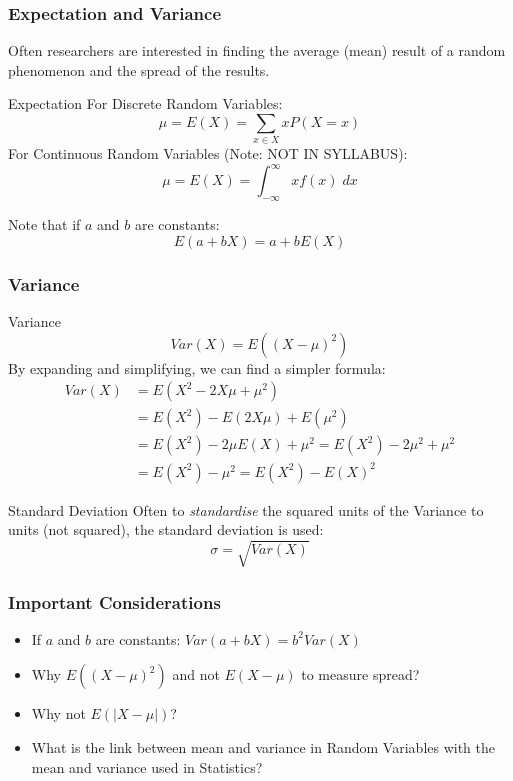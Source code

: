\documentclass{beamer}
\begin{document}
\begin{frame}
  \frametitle{Expectation and Variance}
  Often researchers are interested in finding the average (mean) result of a random phenomenon and the spread of the results.
  \begin{block}{Expectation}
    For Discrete Random Variables:
    \[ \mu = E(X) = \sum_{x \in X} xP(X=x) \]
    For Continuous Random Variables (Note: \alert{NOT IN SYLLABUS}):
    \[ \mu = E(X) = \int_{-\infty}^\infty xf(x)\;dx \]
  \end{block}
  Note that if $a$ and $b$ are constants: \[E(a+bX) = a + bE(X)\]
\end{frame}

\begin{frame}
  \frametitle{Variance}
  \begin{block}{Variance}
    \[ Var(X) = E((X-\mu)^2) \]
    By expanding and simplifying, we can find a simpler formula:
    \begin{align*}
      Var(X) & = E(X^2 - 2X\mu +\mu^2)\\
             & = E(X^2) - E(2X\mu) + E(\mu^2)\\
             & = E(X^2) - 2\mu E(X) + \mu^2 = E(X^2) - 2\mu^2 + \mu^2\\
             & = E(X^2) - \mu^2 = E(X^2) - E(X)^2
    \end{align*}
  \end{block}
  \begin{block}{Standard Deviation}
    Often to \emph{standardise} the squared units of the Variance to units (not squared), the standard deviation is used:
    \[\sigma = \sqrt{Var(X)}\]
  \end{block}
\end{frame}

\begin{frame}
  \frametitle{Important Considerations}
  \begin{itemize}
    \item<1-> If $a$ and $b$ are constants: $Var(a + bX) = b^2 Var(X)$ %
    \item<2-> Why $E((X-\mu)^2)$ and not $E(X-\mu)$ to measure spread? %
    \item<3-> Why not $E(|X-\mu|)$? %
    \item<4-> What is the link between mean and variance in Random Variables with the mean and variance used in Statistics? %
  \end{itemize}
\end{frame}
\end{document}
